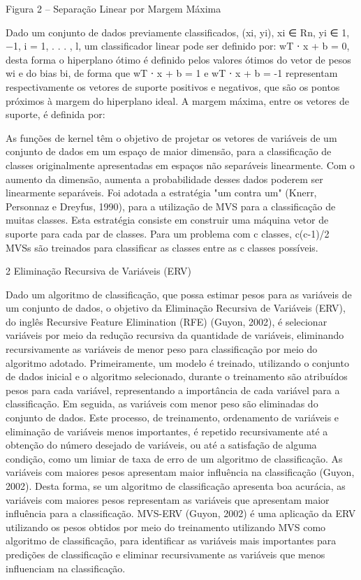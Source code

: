 Figura 2 – Separação Linear por Margem Máxima

Dado um conjunto de dados previamente classificados, (xi, yi), xi ∈ Rn, yi ∈ {1, −1}, i = 1, . . . , l, um classificador linear pode ser definido por: wT ⋅ x + b = 0, desta forma o hiperplano ótimo é definido pelos valores ótimos do vetor de pesos wi e do bias bi, de forma que wT ⋅ x + b = 1 e wT ⋅ x + b = -1 representam respectivamente os vetores de suporte positivos e negativos, que são os pontos próximos à margem do hiperplano ideal. A margem máxima, entre os vetores de suporte, é definida por:

As funções de kernel têm o objetivo de projetar os vetores de variáveis de um conjunto de dados em um espaço de maior dimensão, para a classificação de classes originalmente apresentadas em espaços não separáveis linearmente. Com o aumento da dimensão, aumenta a probabilidade desses dados poderem ser linearmente separáveis. 
Foi adotada a estratégia "um contra um" (Knerr, Personnaz e Dreyfus, 1990), para a utilização de MVS para a classificação de muitas classes. Esta estratégia consiste em construir uma máquina vetor de suporte para cada par de classes. Para um problema com c classes, c(c-1)/2 MVSs são treinados para classificar as classes entre as c classes possíveis.

2 Eliminação Recursiva de Variáveis (ERV)

Dado um algoritmo de classificação, que possa estimar pesos para as variáveis de um conjunto de dados, o objetivo da Eliminação Recursiva de Variáveis (ERV), do inglês Recursive Feature Elimination (RFE) (Guyon, 2002), é selecionar variáveis por meio da redução recursiva da quantidade de variáveis, eliminando recursivamente as variáveis de menor peso para classificação por meio do algoritmo adotado. 
Primeiramente, um modelo é treinado, utilizando o conjunto de dados inicial e o algoritmo selecionado, durante o treinamento são atribuídos pesos para cada variável, representando a importância de cada variável para a classificação. Em seguida, as variáveis com menor peso são eliminadas do conjunto de dados. Este processo, de treinamento, ordenamento de variáveis e eliminação de variáveis menos importantes, é repetido recursivamente até a obtenção do número desejado de variáveis, ou até a satisfação de alguma condição, como um limiar de taxa de erro de um algoritmo de classificação.
As variáveis com maiores pesos apresentam maior influência na classificação (Guyon, 2002). Desta forma, se um algoritmo de classificação apresenta boa acurácia, as variáveis com maiores pesos representam as variáveis que apresentam maior influência para a classificação.
MVS-ERV (Guyon, 2002) é uma aplicação da ERV utilizando os pesos obtidos por meio do treinamento utilizando MVS como algoritmo de classificação, para identificar as variáveis mais importantes para predições de classificação e eliminar recursivamente as variáveis que menos influenciam na classificação.

